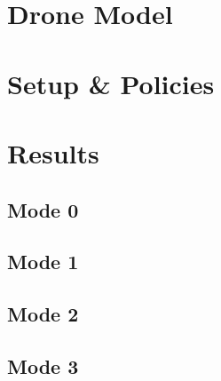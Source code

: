 \section{Drone Model}

\newpage

\section{Setup \& Policies}

\newpage

\section{Results}

\subsection{Mode 0}

\newpage

\subsection{Mode 1}

\newpage

\subsection{Mode 2}

\newpage

\subsection{Mode 3}